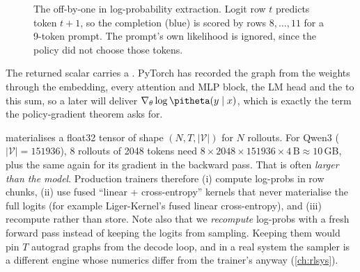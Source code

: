 \begin{figure}[ht]
\centering
{}
\caption{The off-by-one in log-probability extraction. Logit row $t$ predicts token $t+1$,
so the completion (blue) is scored by rows $8,\dots,11$ for a 9-token prompt. The
prompt's own likelihood is ignored, since the policy did not choose those tokens.}
\label{fig:grpo:shift}
\end{figure}

The returned scalar carries a . PyTorch has recorded the graph from the
weights through the embedding, every attention and MLP block, the LM head and the
 to this sum, so a later  will deliver
$\nabla_\theta\log\pitheta(y\mid x)$, which is exactly the term the policy-gradient theorem asks for.

\begin{systemslens}
 materialises a float32 tensor of shape
$(N, T, |\mathcal V|)$ for $N$ rollouts. For Qwen3 ($|\mathcal V|=\num{151936}$), 8 rollouts
of 2048 tokens need $8\times2048\times\num{151936}\times4\,\text{B}\approx10$\,GB, plus the
same again for its gradient in the backward pass. That is often \emph{larger than the
model}. Production trainers therefore (i) compute log-probs in row chunks, (ii) use fused
``linear + cross-entropy'' kernels that never materialise the full logits (for example
Liger-Kernel's fused linear cross-entropy), and (iii) recompute rather than store. Note
also that we \emph{recompute} log-probs with a fresh forward pass instead of keeping the
logits from sampling. Keeping them would pin $T$ autograd graphs from the decode loop,
and in a real system the sampler is a different engine whose numerics differ from the
trainer's anyway (\cref{ch:rlsys}).
\end{systemslens}

